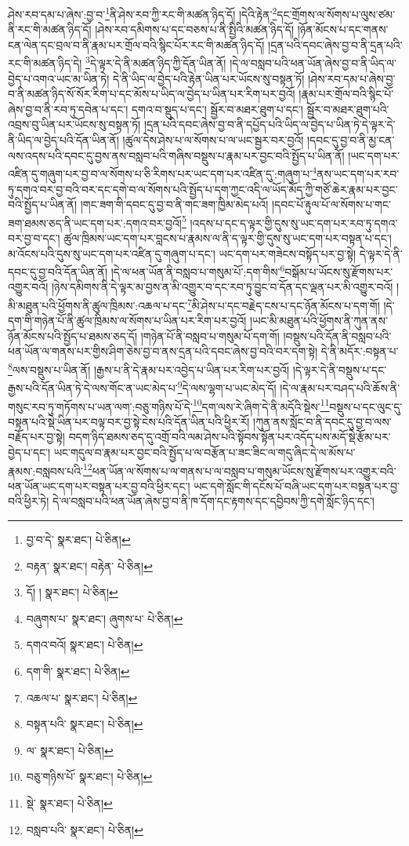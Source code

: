 ཤེས་རབ་དམ་པ་ཞེས་:བྱ་བ་\footnote{བྱ་བ་དེ་  སྣར་ཐང་།  པེ་ཅིན། }ནི་ཤེས་རབ་ཀྱི་རང་གི་མཚན་ཉིད་དོ། །དེའི་རྟེན་\footnote{བརྟན་  སྣར་ཐང་། བརྟེན་  པེ་ཅིན། }དང་གྲོགས་ལ་སོགས་པ་ལུས་ཙམ་ནི་རང་གི་མཚན་ཉིད་དོ། །ཤེས་རབ་དམིགས་པ་དང་བཅས་པ་ནི་སྤྱིའི་མཚན་ཉིད་དོ། །ཉོན་མོངས་པ་དང་གནས་ངན་ལེན་དང་བྲལ་བ་ནི་རྣམ་པར་གྲོལ་བའི་སྙིང་པོར་རང་གི་མཚན་ཉིད་དོ། །དྲན་པའི་དབང་ཞེས་བྱ་བ་ནི་དྲན་པའི་རང་གི་མཚན་ཉིད་དེ། \footnote{དོ། །   སྣར་ཐང་།  པེ་ཅིན། }དེ་ལྟར་དེ་ནི་མཚན་ཉིད་ཀྱི་དོན་ཡིན་ནོ། །དེ་ལ་བསླབ་པའི་ཕན་ཡོན་ཞེས་བྱ་བ་ནི་ཡིད་ལ་བྱེད་པ་འགའ་ཡང་མ་ཡིན་ཏེ། དེ་ནི་ཡིད་ལ་བྱེད་པའི་རྟེན་ཡིན་པར་ཡོངས་སུ་བསྟན་ཏོ། །ཤེས་རབ་དམ་པ་ཞེས་བྱ་བ་ནི་མཚན་ཉིད་སོ་སོར་རིག་པ་དང་མོས་པ་ཡིད་ལ་བྱེད་པ་ཡིན་པར་རིག་པར་བྱའོ། །རྣམ་པར་གྲོལ་བའི་སྙིང་པོ་ཞེས་བྱ་བ་ནི་རབ་ཏུ་དབེན་པ་དང་། དགའ་བ་སྡུད་པ་དང་། སྦྱོར་བ་མཐར་ཐུག་པ་དང་། སྦྱོར་བ་མཐར་ཐུག་པའི་འབྲས་བུ་ཡིན་པར་ཡོངས་སུ་བསྟན་ཏོ། །དྲན་པའི་དབང་ཞེས་བྱ་བ་ནི་དཔྱོད་པའི་ཡིད་ལ་བྱེད་པ་ཡིན་ཏེ་དེ་ལྟར་དེ་ནི་ཡིད་ལ་བྱེད་པའི་དོན་ཡིན་ནོ། །ཚུལ་དེས་ཤེས་པ་ལ་སོགས་པ་ལ་ཡང་སྦྱར་བར་བྱའོ། །དབང་དུ་བྱ་བ་ནི་མྱ་ངན་ལས་འདས་པའི་དབང་དུ་བྱས་ནས་བསླབ་པའི་གཞིས་བསྡུས་པ་རྣམ་པར་བྱང་བའི་སྤྱོད་པ་ཡིན་ནོ། །ཡང་དག་པར་འཛིན་དུ་གཞུག་པར་བྱ་བ་ལ་སོགས་པ་ཅི་རིགས་པར་ཡང་དག་པར་འཛིན་དུ་:གཞུག་པ་\footnote{བཞུགས་པ་  སྣར་ཐང་། ཞུགས་པ་  པེ་ཅིན། }ནས་ཡང་དག་པར་རབ་ཏུ་དགའ་བར་བྱ་བའི་བར་དང་དགེ་བ་ལ་སོགས་པའི་སྤྱོད་པ་དག་ཀྱང་འདི་ལ་ཡོད་མོད་ཀྱི་གཙོ་ཆེར་རྣམ་པར་བྱང་བའི་སྤྱོད་པ་ཡིན་ནོ། །གང་ཟག་གི་དབང་དུ་བྱ་བ་ནི་གང་ཟག་ཁྱིམ་མེད་པའོ། །དབང་པོ་རྟུལ་པོ་ལ་སོགས་པ་གང་ཟག་ཐམས་ཅད་ནི་ཡང་དག་པར་:དགའ་བར་བྱའོ།\footnote{དགའ་བའོ།  སྣར་ཐང་།  པེ་ཅིན། } །འདས་པ་དང་ད་ལྟར་གྱི་དུས་སུ་ཡང་དག་པར་རབ་ཏུ་དགའ་བར་བྱ་བ་དང་། ཚུལ་ཁྲིམས་ཡང་དག་པར་བླངས་པ་རྣམས་ལ་ནི་ད་ལྟར་གྱི་དུས་སུ་ཡང་དག་པར་བསྟན་པ་དང་། མ་འོངས་པའི་དུས་སུ་ཡང་དག་པར་འཛིན་དུ་གཞུག་པ་དང་། ཡང་དག་པར་གཟེངས་བསྟོད་པར་བྱ་སྟེ། དེ་ལྟར་དེ་ནི་དབང་དུ་བྱ་བའི་དོན་ཡིན་ནོ། །དེ་ལ་ཕན་ཡོན་ནི་བསླབ་པ་གསུམ་པོ་:དག་གིས་\footnote{དག་གི་  སྣར་ཐང་།  པེ་ཅིན། }བསྒོམ་པ་ཡོངས་སུ་རྫོགས་པར་འགྱུར་བའོ། །ཉེས་དམིགས་ནི་དེ་ལྟར་མ་བྱས་ན་མི་འགྱུར་བ་དང་རབ་ཏུ་བྱུང་བ་དོན་དང་ལྡན་པར་མི་འགྱུར་བའོ། །མི་མཐུན་པའི་ཕྱོགས་ནི་ཚུལ་ཁྲིམས་:འཆལ་པ་དང་\footnote{འཆལ་པ་  སྣར་ཐང་།  པེ་ཅིན། }མི་ཤེས་པ་དང་བརྗེད་ངས་པ་དང་ཉོན་མོངས་པ་དག་གོ། །དེ་དག་གི་གཉེན་པོ་ནི་ཚུལ་ཁྲིམས་ལ་སོགས་པ་ཡིན་པར་རིག་པར་བྱའོ། །ཡང་མི་མཐུན་པའི་ཕྱོགས་ནི་ཀུན་ནས་ཉོན་མོངས་པའི་སྤྱོད་པ་ཐམས་ཅད་དོ། །གཉེན་པོ་ནི་བསླབ་པ་གསུམ་པོ་དག་གོ། །བསྡུས་པའི་དོན་ནི་བསླབ་པའི་ཕན་ཡོན་ལ་གནས་པར་གྱིས་ཤིག་ཅེས་བྱ་བ་ནས་དྲན་པའི་དབང་ཞེས་བྱ་བའི་བར་དག་སྟེ། དེ་ནི་མདོར་:བསྟན་པ་\footnote{བསྟན་པའི་  སྣར་ཐང་།  པེ་ཅིན། }ལས་བསྡུས་པ་ཡིན་ནོ། །རྒྱས་པ་ནི་དེ་རྣམ་པར་འབྱེད་པ་ཡིན་པར་རིག་པར་བྱའོ། །དེ་ལྟར་དེ་ནི་བསྡུས་པ་དང་རྒྱས་པའི་དོན་ཡིན་ཏེ་དེ་ལས་གོང་ན་ཡང་མེད་པ་\footnote{ལ་  སྣར་ཐང་།  པེ་ཅིན། }དེ་ལས་ལྷག་པ་ཡང་མེད་དོ། །དེ་ལ་རྣམ་པར་བཤད་པའི་ཆོས་ནི་གསུང་རབ་ཏུ་གཏོགས་པ་ཡན་ལག་:བཅུ་གཉིས་པོ་དེ་\footnote{བཅུ་གཉིས་པོ་  སྣར་ཐང་།  པེ་ཅིན། }དག་ལས་རེ་ཞིག་དེ་ནི་མདོའི་སྡེས་\footnote{སྡེ་  སྣར་ཐང་།  པེ་ཅིན། }བསྡུས་པ་དང་ལུང་དུ་བསྟན་པའི་སྡེ་ཡིན་པར་བལྟ་བར་བྱ་སྟེ་ངེས་པའི་དོན་ཡིན་པའི་ཕྱིར་རོ། །ཀུན་ནས་སློང་བ་ནི་དབང་དུ་བྱ་བ་ལས་བརྗོད་པར་བྱ་སྟེ། བདག་ཉིད་ཐམས་ཅད་དུ་འགྲོ་བའི་ལམ་ཤེས་པའི་སྟོབས་སྟོན་པར་འདོད་པས་མདོ་སྡེ་རྩོམ་པར་བྱེད་པ་དང་། ཡང་གདུལ་བ་རྣམ་པར་བྱང་བའི་སྤྱོད་པ་ལ་བརྩོན་པ་ཟང་ཟིང་ལ་གདུ་ཞིང་དེ་ལ་མོས་པ་རྣམས་:བསླབས་པའི་\footnote{བསླབ་པའི་  སྣར་ཐང་།  པེ་ཅིན། }ཕན་ཡོན་ལ་སོགས་པ་ལ་གནས་པ་ལ་བསླབ་པ་གསུམ་ཡོངས་སུ་རྫོགས་པར་འགྱུར་བའི་ཕན་ཡོན་ཡང་དག་པར་བསྟན་པར་བྱ་བའི་ཕྱིར་དང་། ཡང་དགེ་སློང་གི་དངོས་པོ་བཞི་ཡང་དག་པར་བསྟན་པར་བྱ་བའི་ཕྱིར་ཏེ། དེ་ལ་བསླབ་པའི་ཕན་ཡོན་ཞེས་བྱ་བ་ནི་ཁ་དོག་དང་རྟགས་དང་དབྱིབས་ཀྱི་དགེ་སློང་ཉིད་དང་། 